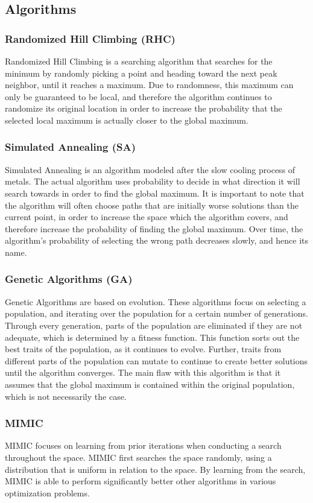 \documentclass[annual]{acmsiggraph}
\begin{document}
\subsection{Algorithms}
\subsubsection{Randomized Hill Climbing (RHC)}
Randomized Hill Climbing is a searching algorithm that searches for the minimum by randomly
picking a point and heading toward the next peak neighbor, until it reaches a maximum. Due to
randomness, this maximum can only be guaranteed to be local, and therefore the algorithm continues
to randomize its original location in order to increase the probability that the selected local
maximum is actually closer to the global maximum. 
\subsubsection{Simulated Annealing (SA)}
Simulated Annealing is an algorithm modeled after the slow cooling process of metals. The actual
algorithm uses probability to decide in what direction it will search towards in order to find the
global maximum. It is important to note that the algorithm will often choose paths that are initially
worse solutions than the current point, in order to increase the space which the algorithm covers, and
therefore increase the probability of finding the global maximum. Over time, the algorithm's probability
of selecting the wrong path decreases slowly, and hence its name.
\subsubsection{Genetic Algorithms (GA)}
Genetic Algorithms are based on evolution. These algorithms focus on selecting a population, and iterating
over the population for a certain number of generations. Through every generation, parts of the population
are eliminated if they are not adequate, which is determined by a fitness function. This function sorts out
the best traits of the population, as it continues to evolve. Further, traits from different parts of the
population can mutate to continue to create better solutions until the algorithm converges. The main flaw
with this algorithm is that it assumes that the global maximum is contained within the original population,
which is not necessarily the case.
\subsubsection{MIMIC}
MIMIC focuses on learning from prior iterations when conducting a search throughout the space. MIMIC first
searches the space randomly, using a distribution that is uniform in relation to the space. By learning from
the search, MIMIC is able to perform significantly better other algorithms in various optimization problems.
\end{document}
